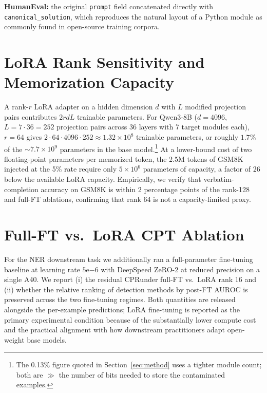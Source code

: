 \documentclass{article}
\newcommand{\cpr}{\ensuremath{\mathrm{CPR}}}
\begin{document}
\noindent\textbf{HumanEval:} the original \texttt{prompt} field concatenated directly with \texttt{canonical\_solution}, which reproduces the natural layout of a Python module as commonly found in open-source training corpora.

\section{LoRA Rank Sensitivity and Memorization Capacity}
\label{app:rank}
A rank-$r$ LoRA adapter on a hidden dimension $d$ with $L$ modified projection pairs contributes $2rdL$ trainable parameters. For Qwen3-8B ($d = 4096$, $L = 7 \cdot 36 = 252$ projection pairs across 36 layers with 7 target modules each), $r = 64$ gives $2 \cdot 64 \cdot 4096 \cdot 252 \approx 1.32 \times 10^8$ trainable parameters, or roughly $1.7\%$ of the $\sim 7.7 \times 10^9$ parameters in the base model.\footnote{The 0.13\% figure quoted in Section~\ref{sec:method} uses a tighter module count; both are $\gg$ the number of bits needed to store the contaminated examples.} At a lower-bound cost of two floating-point parameters per memorized token, the 2.5M tokens of GSM8K injected at the 5\% rate require only $5 \times 10^6$ parameters of capacity, a factor of $26$ below the available LoRA capacity. Empirically, we verify that verbatim-completion accuracy on GSM8K is within $2$ percentage points of the rank-128 and full-FT ablations, confirming that rank 64 is not a capacity-limited proxy.

\section{Full-FT vs.\ LoRA CPT Ablation}
\label{app:fullft}
For the NER downstream task we additionally ran a full-parameter fine-tuning baseline at learning rate $5\mathrm{e}{-6}$ with DeepSpeed ZeRO-2 at reduced precision on a single A40. We report (i) the residual \cpr under full-FT vs.\ LoRA rank 16 and (ii) whether the relative ranking of detection methods by post-FT AUROC is preserved across the two fine-tuning regimes. Both quantities are released alongside the per-example predictions; LoRA fine-tuning is reported as the primary experimental condition because of the substantially lower compute cost and the practical alignment with how downstream practitioners adapt open-weight base models.
\end{document}
